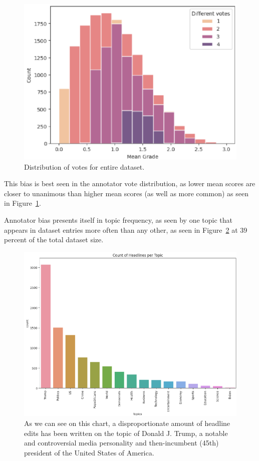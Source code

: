 \documentclass[10pt, a4paper]{article}
\begin{document}
\begin{figure}
\begin{center}
\includegraphics[width=\columnwidth]{vote distribution.pdf}
\caption{Distribution of votes for entire dataset.}
\label{fig:figure1}
\end{center}
\end{figure}

This bias is best seen in the annotator vote distribution, as lower mean scores are closer to unanimous than higher mean scores (as well as more common) as seen in Figure~\ref{fig:figure1}.


Annotator bias presents itself in topic frequency, as seen by one topic that appears in dataset entries more often than any other, as seen in Figure~\ref{fig:figure2} at 39 percent of the total dataset size.

\begin{figure}
\begin{center}
\includegraphics[width=\columnwidth]{topics_disproportion.pdf}
\caption{As we can see on this chart, a disproportionate amount of headline edits has been written on the topic of Donald J. Trump, a notable and controversial media personality and then-incumbent (45th) president of the United States of America.}
\label{fig:figure2}
\end{center}
\end{figure}
\end{document}
